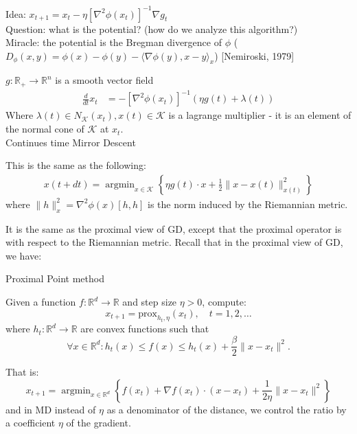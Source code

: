 \documentclass[11pt]{book} %
\DeclareMathOperator*{\argmin}{argmin}
\begin{document}
Idea: $x_{t+1} = x_t - \eta [\nabla^2 \phi(x_t)]^{-1} \nabla g_t $ \\
Question: what is the potential? (how do we analyze this algorithm?) \\
Miracle: the potential is the Bregman divergence of $\phi$ ($D_{\phi}(x, y) = \phi(x) - \phi(y) - \langle \nabla \phi(y), x-y \rangle_x$) [Nemiroski, 1979] 

\bigbreak

\begin{algorithm}[H]
    \SetNoFillComment
    \SetAlgoLined
    $g : \mathbb{R}_+ \to \mathbb{R}^n$ is a smooth vector field \\
    \begin{align*}
        \frac{d}{dt} x_t &= -[\nabla^2 \phi(x_t)]^{-1} (\eta g(t) + \lambda (t))
    \end{align*}
    Where $\lambda(t) \in N_{\mathcal{K}}(x_t), x(t) \in \mathcal{K}$ is a lagrange multiplier - it is an element of the normal cone of $\mathcal{K}$ at $x_t$. \\
    \caption{Continues time Mirror Descent} \label{Continues time Mirror Descent}

    This is the same as the following: 
    \begin{align*}
        x(t + dt) = \argmin_{x \in \mathcal{K}} \left\{ \eta g(t) \cdot x + \frac{1}{2} \| x - x(t) \|^2_{x(t)} \right\}
    \end{align*}
    where $\| h \|^2_x = \nabla^2 \phi(x) [h, h]$ is the norm induced by the Riemannian metric. \\
\end{algorithm}

It is the same as the proximal view of GD, except that the proximal operator is with respect to the Riemannian metric.
Recall that in the proximal view of GD, we have:

\begin{algorithm}[H]
    \caption{Proximal Point method} \label{alg:proximal_point_method}
    Given a function \( f \colon \mathbb{R}^d \to \mathbb{R} \) and step size \( \eta > 0 \), compute:
    \[ x_{t+1} = \text{prox}_{h_t,\eta}(x_t), \quad t = 1, 2, \ldots \]
    where \( h_t \colon \mathbb{R}^d \to \mathbb{R} \) are convex functions such that
    \[ \forall x \in \mathbb{R}^d \colon h_t(x) \leq f(x) \leq h_t(x) + \frac{\beta}{2} \| x - x_t \|^2. \]    
\end{algorithm}
That is: \[ x_{t+1} = \argmin_{x \in \mathbb{R}^d} \left\{ f(x_t) + \nabla f(x_t) \cdot (x - x_t) + \frac{1}{2\eta} \| x - x_t \|^2 \right\} \] 
and in MD instead of $\eta$ as a denominator of the distance, we control the ratio by a coefficient $\eta$ of the gradient.
\end{document}
